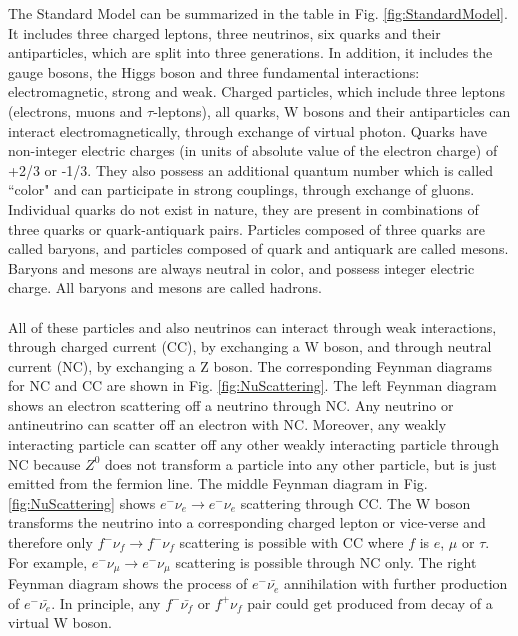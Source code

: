 The Standard Model can be summarized in the table in Fig. \ref{fig:StandardModel}. It includes three charged leptons, three neutrinos, six quarks and their antiparticles, which are split into three generations. In addition, it includes the gauge bosons, the Higgs boson and three fundamental interactions: electromagnetic, strong and weak. Charged particles, which include three leptons (electrons, muons and $\tau$-leptons), all quarks, W bosons and their antiparticles can interact electromagnetically, through exchange of virtual photon. Quarks have non-integer electric charges (in units of absolute value of the electron charge) of +2/3 or -1/3. They also possess an additional quantum number which is called ``color" and can participate in strong couplings, through exchange of gluons. Individual quarks do not exist in nature, they are present in combinations of three quarks or quark-antiquark pairs. Particles composed of three quarks are called baryons, and particles composed of quark and antiquark are called mesons. Baryons and mesons are always neutral in color, and possess integer electric charge. All baryons and mesons are called hadrons.\\ \\
All of these particles and also neutrinos can interact through weak interactions, through charged current (CC), by exchanging a W boson, and through neutral current (NC), by exchanging a Z boson. The corresponding Feynman diagrams for NC and CC are shown in Fig. \ref{fig:NuScattering}. The left Feynman diagram shows an electron scattering off a neutrino through NC. Any neutrino or antineutrino can scatter off an electron with NC. Moreover, any weakly interacting particle can scatter off any other weakly interacting particle through NC because $Z^0$ does not transform a particle into any other particle, but is just emitted from the fermion line. The middle Feynman diagram in Fig. \ref{fig:NuScattering} shows $e^- \nu_e \rightarrow e^- \nu_e$ scattering through CC. The W boson transforms the neutrino into a corresponding charged lepton or vice-verse and therefore only $f^- \nu_f \rightarrow f^- \nu_f$ scattering is possible with CC where $f$ is $e$, $\mu$ or $\tau$. For example, $e^- \nu_\mu \rightarrow e^- \nu_\mu$ scattering is possible through NC only. The right Feynman diagram shows the process of $e^- \bar{\nu_e}$ annihilation with further production of $e^- \bar{\nu_e}$. In principle, any $f^- \bar{\nu_f}$ or $f^+ \nu_f$ pair could get produced from decay of a virtual W boson.\\ \\
